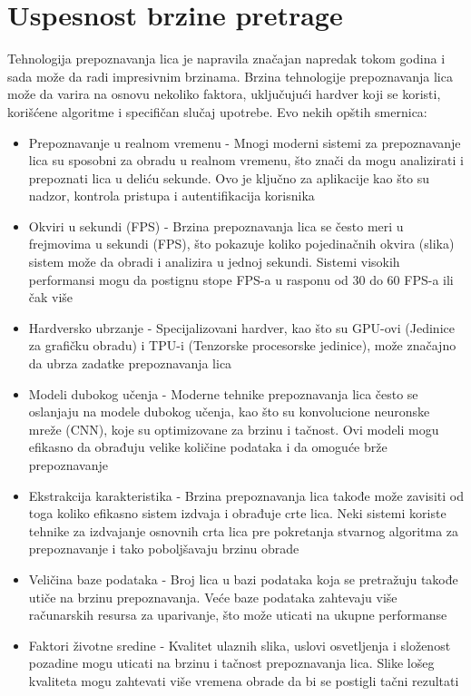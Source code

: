 \documentclass[a4paper]{article}
\begin{document}
\section{Uspesnost brzine pretrage}
\label{sec:brzina pretrage}
Tehnologija prepoznavanja lica je napravila značajan napredak tokom godina i sada može da radi impresivnim brzinama. Brzina tehnologije prepoznavanja lica može da varira na osnovu nekoliko faktora, uključujući hardver koji se koristi, korišćene algoritme i specifičan slučaj upotrebe. Evo nekih opštih smernica:
\begin{itemize}
\item Prepoznavanje u realnom vremenu - Mnogi moderni sistemi za prepoznavanje lica su sposobni za obradu u realnom vremenu, što znači da mogu analizirati i prepoznati lica u deliću sekunde. Ovo je ključno za aplikacije kao što su nadzor, kontrola pristupa i autentifikacija korisnika
\item Okviri u sekundi (FPS) - Brzina prepoznavanja lica se često meri u frejmovima u sekundi  (FPS), što pokazuje koliko pojedinačnih okvira (slika) sistem može da obradi i analizira u jednoj sekundi. Sistemi visokih performansi mogu da postignu stope FPS-a u rasponu od 30 do 60 FPS-a ili čak više
\item   Hardversko ubrzanje - Specijalizovani hardver, kao što su GPU-ovi (Jedinice za grafičku obradu) i TPU-i (Tenzorske procesorske jedinice), može značajno da ubrza zadatke prepoznavanja lica
\item Modeli dubokog učenja - Moderne tehnike prepoznavanja lica često se oslanjaju na modele dubokog učenja, kao što su konvolucione neuronske mreže (CNN), koje su optimizovane za brzinu i tačnost. Ovi modeli mogu efikasno da obrađuju velike količine podataka i da omoguće brže prepoznavanje
\item Ekstrakcija karakteristika - Brzina prepoznavanja lica takođe može zavisiti od toga koliko efikasno sistem izdvaja i obrađuje crte lica. Neki sistemi koriste tehnike za izdvajanje osnovnih crta lica pre pokretanja stvarnog algoritma za prepoznavanje i tako poboljšavaju brzinu obrade
\item Veličina baze podataka - Broj lica u bazi podataka koja se pretražuju takođe utiče na brzinu prepoznavanja. Veće baze podataka zahtevaju više računarskih resursa za uparivanje, što može uticati na ukupne performanse
\item Faktori životne sredine - Kvalitet ulaznih slika, uslovi osvetljenja i složenost pozadine mogu uticati na brzinu i tačnost prepoznavanja lica. Slike lošeg kvaliteta mogu zahtevati više vremena obrade da bi se postigli tačni rezultati
\end{itemize}  
\end{document}
